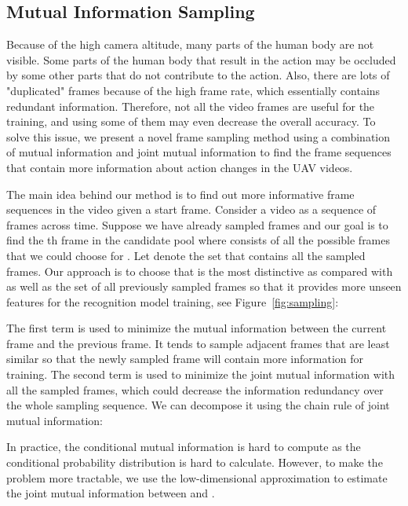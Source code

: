 \documentclass[10pt,twocolumn,letterpaper]{article}
\begin{document}
{\begin{table*}[!t]
\vspace{-7pt}
\label{tab:resolution}
\end{table*} \subsection{Mutual Information Sampling}\label{subsec:sampling}
Because of the high camera altitude, many parts of the human body are not visible. Some parts of the human body that result in the action may be occluded by some other parts that do not contribute to the action. Also, there are lots of "duplicated" frames because of the high frame rate, which essentially contains redundant information. Therefore, not all the video frames are useful for the training, and using some of them may even decrease the overall accuracy. To solve this issue, we present a novel frame sampling method using a combination of mutual information and joint mutual information to find the frame sequences that contain more information about action changes in the UAV videos. 

The main idea behind our method is to find out more informative frame sequences in the video given a start frame. Consider a video as a sequence of frames across time. Suppose we have already sampled  frames and our goal is to find the th frame  in the candidate pool  where  consists of all the possible frames that we could choose for . Let  denote the set that contains all the sampled frames. Our approach is to choose  that is the most distinctive as compared with  as well as the set of all previously sampled frames so that it provides more unseen features for the recognition model training, see Figure~\ref{fig:sampling}:

The first term is used to minimize the mutual information between the current frame and the previous frame. It tends to sample adjacent frames that are least similar so that the newly sampled frame will contain more information for training. 
The second term is used to minimize the joint mutual information with all the sampled frames, which could decrease the information redundancy over the whole sampling sequence. We can decompose it using the chain rule of joint mutual information:

In practice, the conditional mutual information is hard to compute as the conditional probability distribution is hard to calculate. However, to make the problem more tractable, we use the low-dimensional approximation to estimate the joint mutual information between  and  \cite{Gao2017EstimatingMI,JMLR:v13:brown12a}.

}
\end{document}
